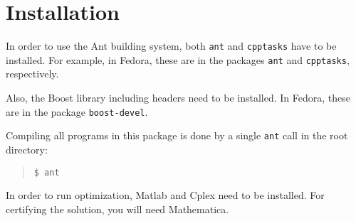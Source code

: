 \documentclass{article}
\begin{document}
\section{Installation}

In order to use the Ant building system, both \texttt{ant} and \texttt{cpptasks} have to be installed. For example, in Fedora, these are in the packages \texttt{ant} and \texttt{cpptasks}, respectively. 

Also, the Boost library including headers need to be installed. In Fedora, these are in the package \texttt{boost-devel}.

Compiling all programs in this package is done by a single \texttt{ant} call
in the root directory:

\begin{quote}
\texttt{\$ ant}
\end{quote}

In order to run optimization, Matlab and Cplex need to be installed. For
certifying the solution, you will need Mathematica.
\end{document}
